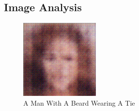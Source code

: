 \documentclass{article}%
\begin{document}
%
\subsection{Image Analysis}%
\label{subsec:ImageAnalysis}%


\begin{figure}[h!]%
\centering%
\includegraphics[width=150px]{500_fake_images/samples_5_338.png}%
\caption{A Man With A Beard Wearing A Tie}%
\end{figure}

%
\end{document}
